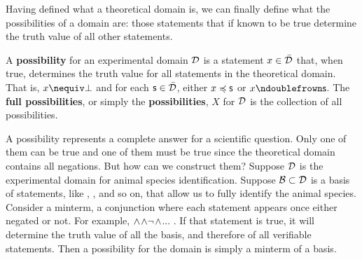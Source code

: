 \documentclass[11pt,letterpaper,fleqn]{memoir} %
\begin{document}
Having defined what a theoretical domain is, we can finally define what the possibilities of a domain are: those statements that if known to be true determine the truth value of all other statements.

\begin{mathSection}

\begin{defn}
	A \textbf{possibility} for an experimental domain $\mathcal{D}$ is a statement $x \in \bar{\mathcal{D}}$ that, when true, determines the truth value for all statements in the theoretical domain. That is, $x \nequiv \contradiction$ and for each $\mathsf{s} \in \bar{\mathcal{D}}$, either $x \preccurlyeq \mathsf{s}$ or $x \ncomp \mathsf{s}$. The \textbf{full possibilities}, or simply the \textbf{possibilities}, $X$ for $\mathcal{D}$ is the collection of all possibilities.
\end{defn}

\end{mathSection}

A possibility represents a complete answer for a scientific question. Only one of them can be true and one of them must be true since the theoretical domain contains all negations. But how can we construct them? Suppose $\mathcal{D}$ is the experimental domain for animal species identification. Suppose $\mathcal{B} \subset \mathcal{D}$ is a basis of statements, like , ,  and so on, that allow us to fully identify the animal species. Consider a minterm, a conjunction where each statement appears once either negated or not. For example, $\wedge$$\wedge\neg$$\wedge$... . If that statement is true, it will determine the truth value of all the basis, and therefore of all verifiable statements. Then a possibility for the domain is simply a minterm of a basis.
\end{document}
